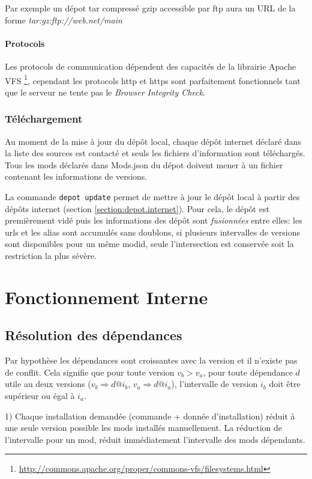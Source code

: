 \documentclass{article}
\begin{document}
Par exemple un dépot tar compressé gzip accessible par ftp aura un URL de la forme \textit{tar:gz:ftp://web.net/main}

\paragraph{Protocols}
Les protocols de communication dépendent des capacités de la librairie Apache VFS \footnote{\url{http://commons.apache.org/proper/commons-vfs/filesystems.html}}, cependant les protocols http et https sont parfaitement fonctionnels tant que le serveur ne tente pas le \textit{Browser Integrity Check}.

\subsubsection{Téléchargement}
Au moment de la mise à jour du dépôt local, chaque dépôt internet déclaré dans la liste des sources est contacté et seuls les fichiers d'information sont téléchargés.
Tous les mods déclarés dans \textsf{Mods.json} du dépot doivent mener à un fichier contenant les informations de versions.

La commande \texttt{depot update} permet de mettre à jour le dépôt local à partir des dépôts internet (section \ref{section:depot.internet}).
Pour cela, le dépôt est premièrement vidé puis les informations des dépôt sont \textit{fusionnées} entre elles: les urls et les alias sont accumulés sans doublons, si plusieurs intervalles de versions sont disponibles pour un même modid, seule l'intersection est conservée soit la restriction la plus sévère.

%
%
\section{Fonctionnement Interne}
\subsection{Résolution des dépendances}
Par hypothèse les dépendances sont croissantes avec la version et il n'existe pas de conflit.
Cela signifie que pour toute version $v_b > v_a$, pour toute dépendance $d$ utile au deux versions ($v_b \Rightarrow d@i_b$, $v_a \Rightarrow d@i_a$), l'intervalle de version $i_b$ doit être supérieur ou égal à $i_a$.

1) Chaque installation demandée (commande + donnée d'installation) réduit à une seule version possible les mods installés manuellement.
La réduction de l'intervalle pour un mod, réduit immédiatement l'intervalle des mods dépendants.
\end{document}
